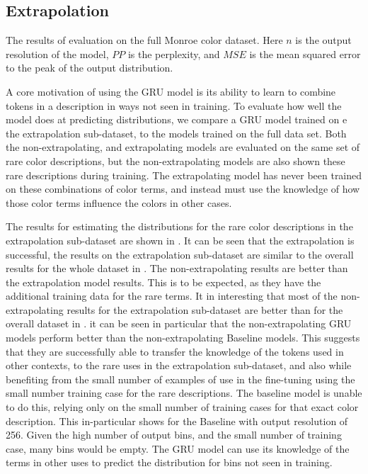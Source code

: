 \documentclass[11pt,letterpaper]{article}
\begin{document}
\subsection{Extrapolation}

\begin{table*}
	\centering
	\caption{\label{tblresextrapo} The results of evaluation on the full Monroe color dataset. Here $n$ is the output resolution of the model, $PP$ is the perplexity, and $MSE$ is the mean squared error to the peak of the output distribution.}
\end{table*}


A core motivation of using the GRU model is its ability to learn to combine tokens in a description in ways not seen in training.
To evaluate how well the model does at predicting distributions,
we compare a GRU model trained on e the extrapolation sub-dataset, to the models trained on the full data set.
Both the non-extrapolating, and extrapolating models are evaluated on the same set of rare color descriptions,
but the non-extrapolating models are also shown these rare descriptions during training.
The extrapolating model has never been trained on these combinations of color terms,
and instead must use the knowledge of how those color terms influence the colors in other cases.

The results for estimating the distributions for the rare color descriptions in the extrapolation sub-dataset are shown in .
It can be seen that the extrapolation is successful, the results on the extrapolation sub-dataset are similar to the overall results for the whole dataset in .
The non-extrapolating results are better than the extrapolation model results.
This is to be expected, as they have the additional training data for the rare terms.
It in interesting that most of the non-extrapolating results for the extrapolation sub-dataset are better than for the overall dataset in .
it can be seen in particular that the non-extrapolating GRU models perform better than the non-extrapolating Baseline models.
This suggests that they are successfully able to transfer the knowledge of the tokens used in other contexts, to the rare uses in the extrapolation sub-dataset, and also while benefiting from the small number of examples of use in the fine-tuning using the small number training case for the rare descriptions.
The baseline model is unable to do this, relying only on the small number of training cases for that exact color description.
This in-particular shows for the Baseline with output resolution of 256.
Given the high number of output bins, and the small number of training case, many bins would be empty.
The GRU model can use its knowledge of the terms in other uses to predict the distribution for bins not seen in training.
\end{document}

